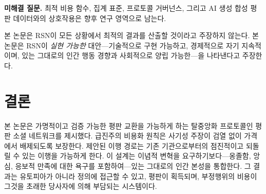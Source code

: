\documentclass[11pt,a4paper,twocolumn]{article}
\begin{document}
\textbf{미해결 질문.} 최적 비용 함수, 집계 표준, 프로토콜 거버넌스, 그리고 AI 생성 합성 평판 데이터와의 상호작용은 향후 연구 영역으로 남는다.

본 논문은 RSN이 모든 상황에서 최적의 결과를 산출할 것이라고 주장하지 않는다. 본 논문은 RSN이 \emph{실현 가능한} 대안---기술적으로 구현 가능하고, 경제적으로 자기 지속적이며, 있는 그대로의 인간 행동 경향과 사회적으로 양립 가능한---을 나타낸다고 주장한다.

\section{결론}

본 논문은 가명적이고 검증 가능한 평판 교환을 가능하게 하는 탈중앙화 프로토콜인 평판 소셜 네트워크를 제시했다. 급진주의 비용화 원칙은 사기성 주장이 검열 없이 가격에서 배제되도록 보장한다. 제안된 이행 경로는 기존 기관으로부터의 점진적이고 되돌릴 수 있는 이행을 가능하게 한다. 이 설계는 이념적 변혁을 요구하기보다---옹졸함, 앙심, 응보적 만족에 대한 욕구를 포함하여---있는 그대로의 인간 본성을 통합한다. 그 결과는 유토피아가 아니라 정의에 접근할 수 있고, 평판이 획득되며, 부정행위의 비용이 그것을 초래한 당사자에 의해 부담되는 시스템이다.


\end{document}
